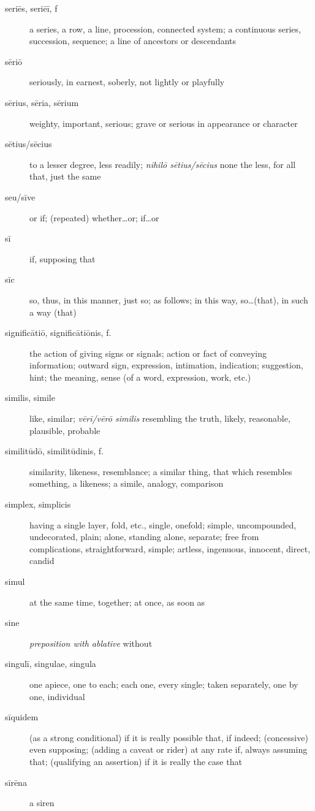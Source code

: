 \begin{description}
    \item[seriēs, seriēī, f] a series, a row, a line, procession, connected system; a continuous series, succession, sequence; a line of ancestors or descendants
    \item[sēriō] seriously, in earnest, soberly, not lightly or playfully
    \item[sērius, sēria, sērium] weighty, important, serious; grave or serious in appearance or character
    \item[sētius/sēcius] to a lesser degree, less readily; \textit{nihilō sētius/sēcius} none the less, for all that, just the same
    \item[seu/sīve] or if; (repeated) whether\dots or; if\dots or
    \item[sī] if, supposing that
    \item[sīc] so, thus, in this manner, just so; as follows; in this way, so\dots (that), in such a way (that)
    \item[significātiō, significātiōnis, f.] the action of giving signs or signals; action or fact of conveying information; outward sign, expression, intimation, indication; suggestion, hint; the meaning, sense (of a word, expression, work, etc.)
    \item[similis, simile] like, similar; \textit{vērī/vērō similis} resembling the truth, likely, reasonable, plausible, probable
    \item[similitūdō, similitūdinis, f.] similarity, likeness, resemblance; a similar thing, that which resembles something, a likeness; a simile, analogy, comparison
    \item[simplex, simplicis] having a single layer, fold, etc., single, onefold; simple, uncompounded, undecorated, plain; alone, standing alone, separate; free from complications, straightforward, simple; artless, ingenuous, innocent, direct, candid
    \item[simul] at the same time, together; at once, as soon as
    \item[sine] \textit{preposition with ablative} without
    \item[singulī, singulae, singula] one apiece, one to each; each one, every single; taken separately, one by one, individual
    \item[sīquidem] (as a strong conditional) if it is really possible that, if indeed; (concessive) even supposing; (adding a caveat or rider) at any rate if, always assuming that; (qualifying an assertion) if it is really the case that
    \item[sīrēna] a siren

\end{description}
